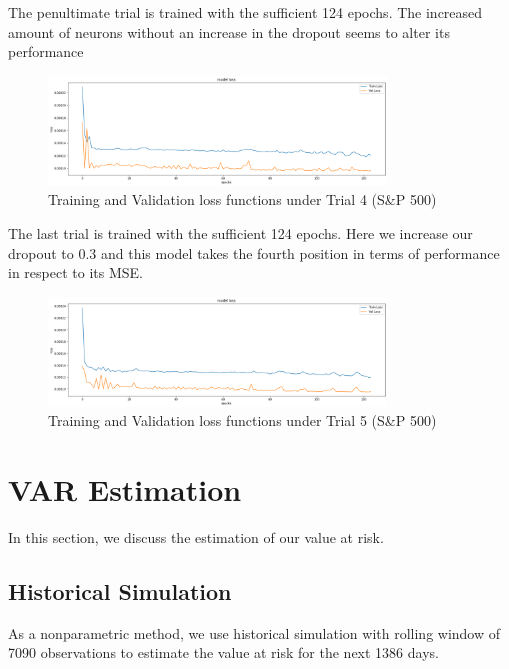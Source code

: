 \documentclass[a4paper,11pt,oneside]{book}
\begin{document}
The penultimate trial is trained with the sufficient 124 epochs. The increased amount of neurons without an increase in the dropout seems to alter its performance \newline
\begin{figure}[!h]
	\centering
	\includegraphics[width=0.8\textwidth]{figures/sanp4}
	\caption{Training and Validation loss functions under Trial 4 (S\&P 500)}
	\label{sanp4}
\end{figure}
\newline The last trial is trained with the sufficient 124 epochs. Here we increase our dropout to 0.3 and this model takes the fourth position in terms of performance in respect to its MSE.
\begin{figure}[!h]
	\centering
	\includegraphics[width=0.8\textwidth]{figures/sanp5}
	\caption{Training and Validation loss functions under Trial 5 (S\&P 500)}
	\label{sanp5}
\end{figure}\newline\newline\newline\newline\newline

\section{VAR Estimation}
In this section, we discuss the estimation of our value at risk.
\subsection{Historical Simulation}
As a nonparametric method, we use historical simulation with rolling window of 7090 observations to estimate the value at risk for the next 1386 days.
\end{document}

